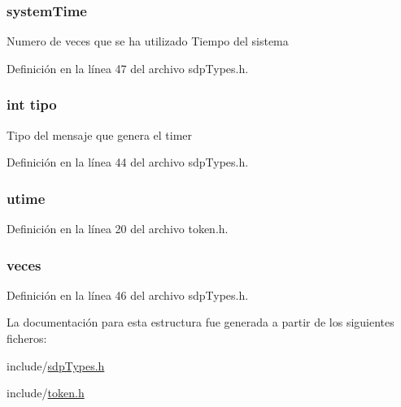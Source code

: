 \subsubsection[{system\+Time}]{ system\+Time}\label{struct_s_t___t_i_m_e_r_a9ff17a87e2d5c2c20efd3883fc5e8afd}
Numero de veces que se ha utilizado Tiempo del sistema 

Definición en la línea 47 del archivo sdp\+Types.\+h.

\hypertarget{struct_s_t___t_i_m_e_r_a913ffe6a1b92facf1adf87d5190445bc}{}
\subsubsection[{tipo}]{\setlength{\rightskip}{0pt plus 5cm}int tipo}\label{struct_s_t___t_i_m_e_r_a913ffe6a1b92facf1adf87d5190445bc}
Tipo del mensaje que genera el timer 

Definición en la línea 44 del archivo sdp\+Types.\+h.

\hypertarget{struct_s_t___t_i_m_e_r_a74777a0ada04040a1c53c70c83a06a4e}{}
\subsubsection[{utime}]{ utime}\label{struct_s_t___t_i_m_e_r_a74777a0ada04040a1c53c70c83a06a4e}


Definición en la línea 20 del archivo token.\+h.

\hypertarget{struct_s_t___t_i_m_e_r_a23a3531ed93eb7f069a5f33ee77d7ca8}{}
\subsubsection[{veces}]{ veces}\label{struct_s_t___t_i_m_e_r_a23a3531ed93eb7f069a5f33ee77d7ca8}


Definición en la línea 46 del archivo sdp\+Types.\+h.



La documentación para esta estructura fue generada a partir de los siguientes ficheros\+:\begin{DoxyCompactItemize}
\item 
include/\hyperlink{sdp_types_8h}{sdp\+Types.\+h}\item 
include/\hyperlink{token_8h}{token.\+h}\end{DoxyCompactItemize}
